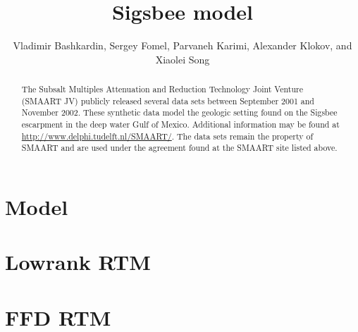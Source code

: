 \author{Vladimir Bashkardin, Sergey Fomel, Parvaneh Karimi, Alexander Klokov, and Xiaolei Song}
\title{Sigsbee model}

\maketitle

\begin{abstract}
The Subsalt Multiples Attenuation and Reduction Technology Joint
Venture (SMAART JV) publicly released several data sets between
September 2001 and November 2002.  These synthetic data model the
geologic setting found on the Sigsbee escarpment in the deep water
Gulf of Mexico.  Additional information may be found
at \url{http://www.delphi.tudelft.nl/SMAART/}.  The data sets remain
the property of SMAART and are used under the agreement found at the
SMAART site listed above.
\end{abstract}

\section{Model}


 \clearpage
{} \clearpage

 \clearpage
{} \clearpage

 \clearpage
{} \clearpage

\section{Lowrank RTM}

 \clearpage
{} \clearpage

\section{FFD RTM}

